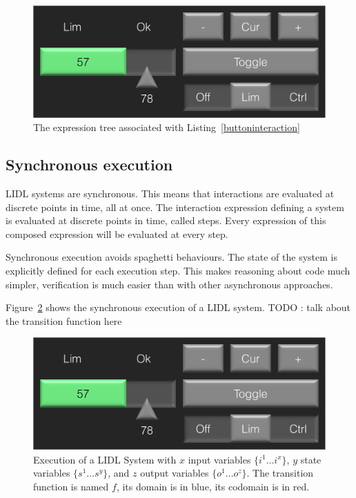 \begin{figure}
\begin{center}
\includegraphics[width=\columnwidth,page=12]{drawings.pdf}
\end{center}
\caption{The expression tree associated with Listing~\ref{buttoninteraction}}
\label{fig-expr-tree}
\end{figure}


\subsection{Synchronous execution}


LIDL systems are synchronous. This means that interactions are evaluated at discrete points in time, all at once. The interaction expression defining a system is evaluated at discrete points in time, called steps. Every expression of this composed expression will be evaluated at every step. 

Synchronous execution avoids spaghetti behaviours. The state of the system is explicitly defined for each execution step. This makes reasoning about code much simpler, verification is much easier than with other asynchronous approaches.

Figure~\ref{fig-sync-exec} shows the synchronous execution of a LIDL system. TODO : talk about the transition function here


\begin{figure}
\begin{center}
\includegraphics[width=\textwidth,page=17]{drawings.pdf}
\end{center}
\caption{Execution of a LIDL System with $x$ input variables $\{i^1 \hdots i^x\}$, $y$ state variables $\{s^1 \hdots s^y\}$, and $z$ output variables $\{o^1 \hdots o^z\}$. The transition function is named $f$, its domain is in blue, its codomain is in red.}
\label{fig-sync-exec}
\end{figure}

